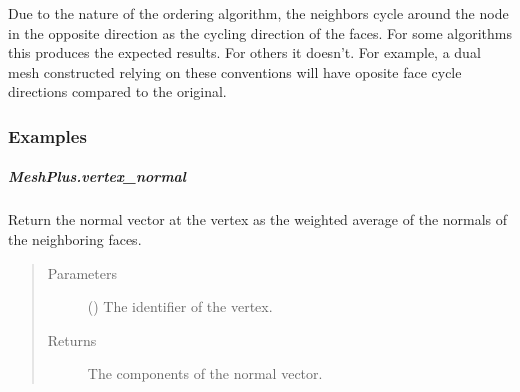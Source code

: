 \documentclass[letterpaper,10pt,english]{sphinxmanual}
\begin{document}
\begin{fulllineitems}
\begin{fulllineitems}
Due to the nature of the ordering algorithm, the neighbors cycle around
the node in the opposite direction as the cycling direction of the faces.
For some algorithms this produces the expected results. For others it doesn’t.
For example, a dual mesh constructed relying on these conventions will have
oposite face cycle directions compared to the original.
\subsubsection*{Examples}

\begin{sphinxVerbatim}[commandchars=\\\{\}]
\end{sphinxVerbatim}

\end{fulllineitems}



\subparagraph{MeshPlus.vertex\_normal}
\label{\detokenize{api/generated/directional_clustering.mesh.MeshPlus.vertex_normal:meshplus-vertex-normal}}\label{\detokenize{api/generated/directional_clustering.mesh.MeshPlus.vertex_normal::doc}}

\begin{fulllineitems}
\label{\detokenize{api/generated/directional_clustering.mesh.MeshPlus.vertex_normal:directional_clustering.mesh.MeshPlus.vertex_normal}}
Return the normal vector at the vertex as the weighted average of the
normals of the neighboring faces.
\begin{quote}\begin{description}
\item[{Parameters}] \leavevmode
{} () \textendash{} The identifier of the vertex.

\item[{Returns}] \leavevmode
{} \textendash{} The components of the normal vector.

\end{description}\end{quote}

\end{fulllineitems}




\end{fulllineitems}
\end{document}
